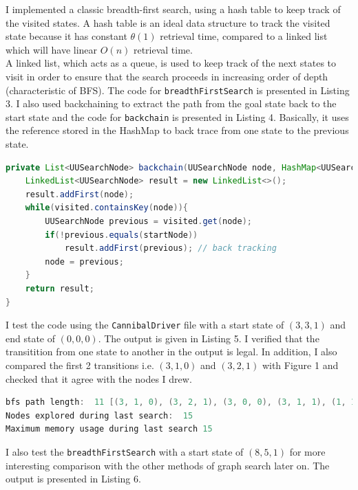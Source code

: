 \documentclass[9.5pt]{extarticle}
\begin{document}
I implemented a classic breadth-first search, using a hash table to keep track of the visited states. A hash table is an ideal data structure to track the visited state because it has constant $\theta(1)$ retrieval time, compared to a linked list which will have linear $O(n)$ retrieval time.\\

A linked list, which acts as a queue, is used to keep track of the next states to visit in order to ensure that the search proceeds in increasing order of depth (characteristic of BFS). The code for  \verb`breadthFirstSearch` is presented in Listing 3. I also used backchaining to extract the path from the goal state back to the start state and the code for \verb`backchain` is presented in Listing 4. Basically, it uses the reference stored in the HashMap to back trace from one state to the previous state.\\

\begin{lstlisting}[language=java,caption={Java code for backchaining}]
private List<UUSearchNode> backchain(UUSearchNode node, HashMap<UUSearchNode, UUSearchNode> visited) {
	LinkedList<UUSearchNode> result = new LinkedList<>();
	result.addFirst(node);
	while(visited.containsKey(node)){
		UUSearchNode previous = visited.get(node);
		if(!previous.equals(startNode))
			result.addFirst(previous); // back tracking
		node = previous;
	}
	return result;
}
\end{lstlisting}

I test the code using the \verb`CannibalDriver` file with a start state of $(3,3,1)$ and end state of $(0,0,0)$. The output is given in Listing 5. I verified that the transitition from one state to another in the output is legal. In addition, I also compared the first 2 transitions i.e. $(3,1,0)$ and $(3,2,1)$ with Figure 1 and checked that it agree with the nodes I drew.\\

\begin{lstlisting}[language=java,caption={Output for BFS for start state of (3, 3, 1)}]
bfs path length:  11 [(3, 1, 0), (3, 2, 1), (3, 0, 0), (3, 1, 1), (1, 1, 0), (2, 2, 1), (0, 2, 0), (0, 3, 1), (0, 1, 0), (0, 2, 1), (0, 0, 0)]
Nodes explored during last search:  15
Maximum memory usage during last search 15
\end{lstlisting}

I also test the \verb`breadthFirstSearch` with a start state of $(8,5,1)$ for more interesting comparison with the other methods of graph search later on. The output is presented in Listing 6.
\end{document}
